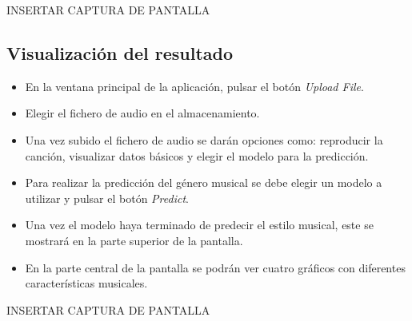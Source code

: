 INSERTAR CAPTURA DE PANTALLA

\subsection{Visualización del resultado}

\begin{itemize}
\tightlist

\item En la ventana principal de la aplicación, pulsar el botón \textit{Upload File}.
\item Elegir el fichero de audio en el almacenamiento.
\item Una vez subido el fichero de audio se darán opciones como: reproducir la canción, visualizar datos básicos y elegir el modelo para la predicción.
\item Para realizar la predicción del género musical se debe elegir un modelo a utilizar y pulsar el botón \textit{Predict}.
\item Una vez el modelo haya terminado de predecir el estilo musical, este se mostrará en la parte superior de la pantalla.
\item En la parte central de la pantalla se podrán ver cuatro gráficos con diferentes características musicales.

\end{itemize}

INSERTAR CAPTURA DE PANTALLA